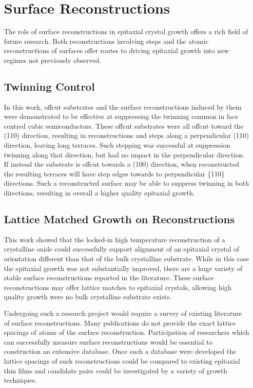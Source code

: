 \section{Surface Reconstructions}
The role of surface reconstructions in epitaxial crystal growth offers a rich field of future research.
Both reconstructions involving steps and the atomic reconstructions of surfaces offer routes to driving epitaxial growth into new regimes not previously observed.
\subsection{Twinning Control} In this work, offcut substrates and the surface reconstructions induced by them were demonstrated to be effective at suppressing the twinning common in face centred cubic semiconductors.
These offcut substrates were all offcut toward the (110) direction, resulting in reconstructions and steps along a perpendicular (110) direction, leaving long terraces.
Such stepping was successful at suppression twinning along that direction, but had no impact in the perpendicular direction.
If instead the substrate is offcut towards a (100) direction, when reconstructed the resulting terraces will have step edges towards to perpendicular \{110\} directions.
Such a reconstructed surface may be able to suppress twinning in both directions, resulting in overall a higher quality epitaxial growth.
\subsection{Lattice Matched Growth on Reconstructions} This work showed that the locked-in high temperature reconstruction of a crystalline oxide could successfully support alignment of an epitaxial crystal of orientation different than that of the bulk crystalline substrate.
While in this case the epitaxial growth was not substantially improved, there are a huge variety of stable surface reconstructions reported in the literature.
These surface reconstructions may offer lattice matches to epitaxial crystals, allowing high quality growth were no bulk crystalline substrate exists.

Undergoing such a research project would require a survey of existing literature of surface reconstructions.
Many publications do not provide the exact lattice spacings of atoms of the surface reconstruction.
Participation of researchers which can successfully measure surface reconstructions would be essential to construction an extensive database.
Once such a database were developed the lattice spacings of such reconstructions could be compared to existing epitaxial thin films and candidate pairs could be investigated by a variety of growth techniques.

